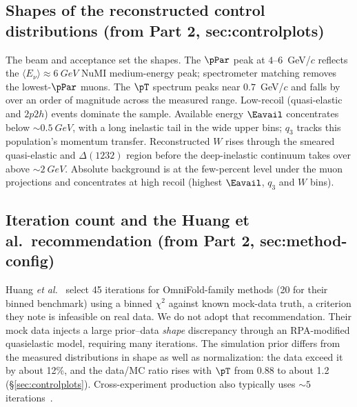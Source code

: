 \subsection{Shapes of the reconstructed control distributions (from Part 2, sec:controlplots)}
The beam and acceptance set the shapes. The $\pPar$ peak at $4$--$6$~GeV/$c$ reflects the ${\langle E_\nu\rangle}\approx\SI{6}{GeV}$ NuMI medium-energy peak; spectrometer matching removes the lowest-$\pPar$ muons. The $\pT$ spectrum peaks near $0.7$~GeV/$c$ and falls by over an order of magnitude across the measured range. Low-recoil (quasi-elastic and $2p2h$) events dominate the sample. Available energy $\Eavail$ concentrates below ${\sim}\SI{0.5}{GeV}$, with a long inelastic tail in the wide upper bins; $q_{3}$ tracks this population's momentum transfer. Reconstructed $W$ rises through the smeared quasi-elastic and $\Delta(1232)$ region before the deep-inelastic continuum takes over above ${\sim}\SI{2}{GeV}$. Absolute background is at the few-percent level under the muon projections and concentrates at high recoil (highest $\Eavail$, $q_{3}$ and $W$ bins).

\subsection{Iteration count and the Huang et al.\ recommendation (from Part 2, sec:method-config)}
Huang \emph{et al.}~\cite{Huang:2025omnifold} select 45 iterations for OmniFold-family methods (20 for their binned benchmark) using a binned $\chi^{2}$ against known mock-data truth, a criterion they note is infeasible on real data. We do not adopt that recommendation. Their mock data injects a large prior--data \emph{shape} discrepancy through an RPA-modified quasielastic model, requiring many iterations. The simulation prior differs from the measured distributions in shape as well as normalization: the data exceed it by about 12\%, and the data/MC ratio rises with $\pT$ from 0.88 to about 1.2 (\S\ref{sec:controlplots}). Cross-experiment production also typically uses ${\sim}5$ iterations~\cite{Canelli:2025guide}.


